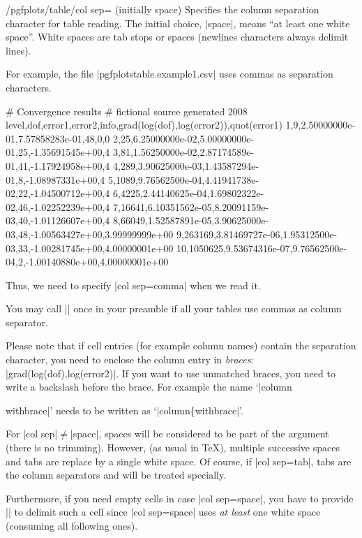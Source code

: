 \documentclass[a4paper]{ltxdoc}
\begin{document}
\begin{key}{/pgfplots/table/col sep= (initially space)}
    Specifies the column separation character for table reading. The initial
    choice, |space|, means ``at least one white space''. White spaces are tab
    stops or spaces (newlines characters always delimit lines).

    For example, the file |pgfplotstable.example1.csv| uses commas as
    separation characters.
\begin{codeexample}
# Convergence results
# fictional source  generated 2008
level,dof,error1,error2,info,{grad(log(dof),log(error2))},quot(error1)
1,9,2.50000000e-01,7.57858283e-01,48,0,0
2,25,6.25000000e-02,5.00000000e-01,25,-1.35691545e+00,4
3,81,1.56250000e-02,2.87174589e-01,41,-1.17924958e+00,4
4,289,3.90625000e-03,1.43587294e-01,8,-1.08987331e+00,4
5,1089,9.76562500e-04,4.41941738e-02,22,-1.04500712e+00,4
6,4225,2.44140625e-04,1.69802322e-02,46,-1.02252239e+00,4
7,16641,6.10351562e-05,8.20091159e-03,40,-1.01126607e+00,4
8,66049,1.52587891e-05,3.90625000e-03,48,-1.00563427e+00,3.99999999e+00
9,263169,3.81469727e-06,1.95312500e-03,33,-1.00281745e+00,4.00000001e+00
10,1050625,9.53674316e-07,9.76562500e-04,2,-1.00140880e+00,4.00000001e+00
\end{codeexample}
    Thus, we need to specify |col sep=comma| when we read it.
\begin{codeexample}[]
\end{codeexample}
    You may call || once in your preamble if
    all your tables use commas as column separator.

    Please note that if cell entries (for example column names) contain the
    separation character, you need to enclose the column entry in
    \emph{braces}: |{grad(log(dof),log(error2)}|. If you want to use unmatched
    braces, you need to write a backslash before the brace. For example the
    name `|column{withbrace|' needs to be written as `|column\{withbrace|'.

    For |col sep|$\neq$|space|, spaces will be considered to be part of the
    argument (there is no trimming). However, (as usual in \TeX{}), multiple
    successive spaces and tabs are replace by a single white space. Of course,
    if |col sep=tab|, tabs are the column separators and will be treated
    specially.

    Furthermore, if you need empty cells in case |col sep=space|, you have to
    provide |{}| to delimit such a cell since |col sep=space| uses \emph{at
    least} one white space (consuming all following ones).

}
\end{key}
\end{document}

